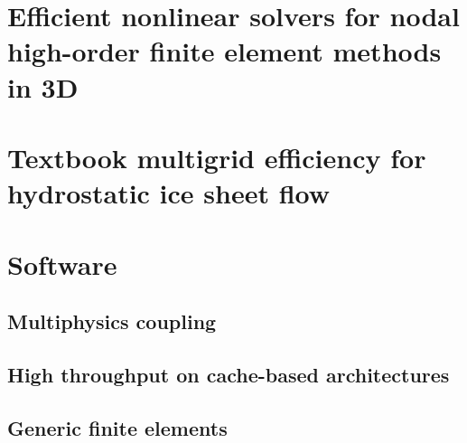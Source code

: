 \documentclass[a4paper,twoside,11pt,pdftex]{report}
\begin{document}
%       

%       

%    
\chapter{Efficient nonlinear solvers for nodal high-order finite element methods in 3D}\label{chap:dohp}

\cleardoublepage

\chapter{Textbook multigrid efficiency for hydrostatic ice sheet flow}\label{chap:tme-ice}


\cleardoublepage
\chapter{Software}\label{chap:software}
\section{Multiphysics coupling}\label{sec:multiphysics}


\section{High throughput on cache-based architectures}\label{sec:throughput}


\section{Generic finite elements}\label{sec:femassembly}

\end{document}
